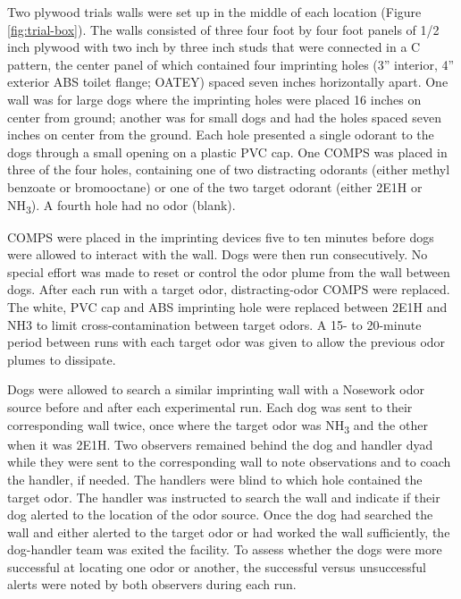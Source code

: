 \documentclass[
]{article}
\begin{document}
Two plywood trials walls were set up in the middle of each location (Figure \ref{fig:trial-box}). The walls consisted of three four foot by four foot panels of 1/2 inch plywood with two inch by three inch studs that were connected in a C pattern, the center panel of which contained four imprinting holes (3'' interior, 4'' exterior ABS toilet flange; OATEY) spaced seven inches horizontally apart. One wall was for large dogs where the imprinting holes were placed 16 inches on center from ground; another was for small dogs and had the holes spaced seven inches on center from the ground. Each hole presented a single odorant to the dogs through a small opening on a plastic PVC cap. One COMPS was placed in three of the four holes, containing one of two distracting odorants (either methyl benzoate or bromooctane) or one of the two target odorant (either 2E1H or NH\textsubscript{3}). A fourth hole had no odor (blank).

COMPS were placed in the imprinting devices five to ten minutes before dogs were allowed to interact with the wall. Dogs were then run consecutively. No special effort was made to reset or control the odor plume from the wall between dogs. After each run with a target odor, distracting-odor COMPS were replaced. The white, PVC cap and ABS imprinting hole were replaced between 2E1H and NH3 to limit cross-contamination between target odors. A 15- to 20-minute period between runs with each target odor was given to allow the previous odor plumes to dissipate.

Dogs were allowed to search a similar imprinting wall with a Nosework odor source before and after each experimental run. Each dog was sent to their corresponding wall twice, once where the target odor was NH\textsubscript{3} and the other when it was 2E1H. Two observers remained behind the dog and handler dyad while they were sent to the corresponding wall to note observations and to coach the handler, if needed. The handlers were blind to which hole contained the target odor. The handler was instructed to search the wall and indicate if their dog alerted to the location of the odor source. Once the dog had searched the wall and either alerted to the target odor or had worked the wall sufficiently, the dog-handler team was exited the facility. To assess whether the dogs were more successful at locating one odor or another, the successful versus unsuccessful alerts were noted by both observers during each run.
\end{document}
